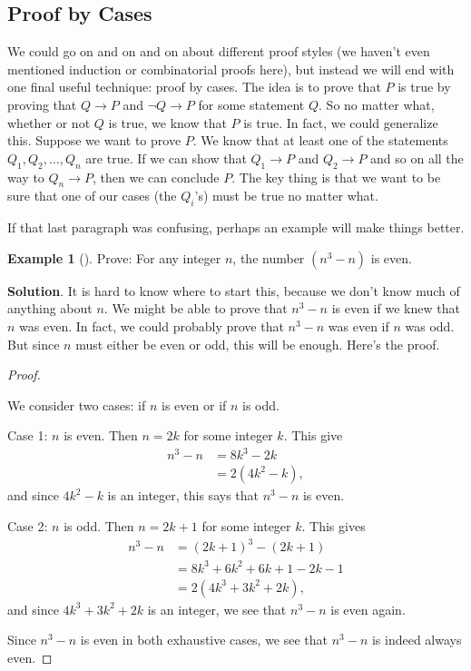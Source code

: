 \documentclass[10pt,]{book}
\theoremstyle{plain}
\theoremstyle{definition}
\theoremstyle{definition}
\newtheorem{example}[theorem]{Example}
\theoremstyle{definition}
\theoremstyle{definition}
\numberwithin{equation}{chapter}
\def\imp{\rightarrow}
\newcommand{\amp}{&}
\begin{document}
\subsection[{Proof by Cases}]{Proof by Cases}\label{subsection-46}
\hypertarget{p-2099}{}%
%
\par
\hypertarget{p-2100}{}%
We could go on and on and on about different proof styles (we haven't even mentioned induction or combinatorial proofs here), but instead we will end with one final useful technique: proof by cases. The idea is to prove that \(P\) is true by proving that \(Q \imp P\) and \(\neg Q \imp P\) for some statement \(Q\). So no matter what, whether or not \(Q\) is true, we know that \(P\) is true. In fact, we could generalize this. Suppose we want to prove \(P\). We know that at least one of the statements \(Q_1, Q_2, \ldots, Q_n\) are true. If we can show that \(Q_1 \imp P\) and \(Q_2 \imp P\) and so on all the way to \(Q_n \imp P\), then we can conclude \(P\). The key thing is that we want to be sure that one of our cases (the \(Q_i\)'s) must be true no matter what.%
\par
\hypertarget{p-2101}{}%
If that last paragraph was confusing, perhaps an example will make things better.%
\begin{example}[]\label{example-73}
\hypertarget{p-2102}{}%
Prove: For any integer \(n\), the number \((n^3 -n)\) is even.%
\par\smallskip%
\noindent\textbf{Solution}.\hypertarget{solution-190}{}\quad%
\hypertarget{p-2103}{}%
It is hard to know where to start this, because we don't know much of anything about \(n\). We might be able to prove that \(n^3 - n\) is even if we knew that \(n\) was even. In fact, we could probably prove that \(n^3-n\) was even if \(n\) was odd. But since \(n\) must either be even or odd, this will be enough. Here's the proof.%
\begin{proof}\hypertarget{proof-29}{}
\hypertarget{p-2104}{}%
We consider two cases: if \(n\) is even or if \(n\) is odd.%
\par
\hypertarget{p-2105}{}%
Case 1: \(n\) is even. Then \(n = 2k\) for some integer \(k\). This give%
\begin{align*}
n^3 - n \amp = 8k^3 - 2k\\
\amp = 2(4k^2 - k),
\end{align*}
and since \(4k^2 - k\) is an integer, this says that \(n^3-n\) is even.%
\par
\hypertarget{p-2106}{}%
Case 2: \(n\) is odd. Then \(n = 2k+1\) for some integer \(k\). This gives%
\begin{align*}
n^3 - n \amp = (2k+1)^3 - (2k+1)\\
\amp = 8k^3 + 6k^2 + 6k + 1 - 2k - 1\\
\amp = 2(4k^3 + 3k^2 + 2k),
\end{align*}
and since \(4k^3 + 3k^2 + 2k\) is an integer, we see that \(n^3 - n\) is even again.%
\par
\hypertarget{p-2107}{}%
Since \(n^3 - n\) is even in both exhaustive cases, we see that \(n^3 - n\) is indeed always even.%
\end{proof}
\end{example}
\end{document}
